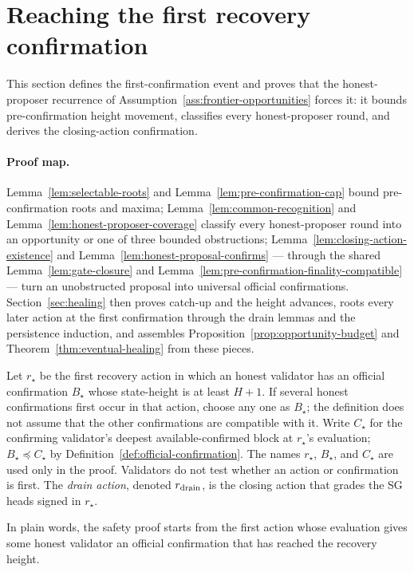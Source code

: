 \section{Reaching the first recovery confirmation}
\label{sec:first-confirmation}

This section defines the first-confirmation event and proves that the
honest-proposer recurrence of
Assumption~\ref{ass:frontier-opportunities} forces it: it bounds
pre-confirmation height movement, classifies every honest-proposer
round, and derives the closing-action confirmation.

\paragraph{Proof map.}
Lemma~\ref{lem:selectable-roots} and
Lemma~\ref{lem:pre-confirmation-cap} bound pre-confirmation roots and
maxima; Lemma~\ref{lem:common-recognition} and
Lemma~\ref{lem:honest-proposer-coverage} classify every
honest-proposer round into an opportunity or one of three bounded
obstructions; Lemma~\ref{lem:closing-action-existence} and
Lemma~\ref{lem:honest-proposal-confirms} --- through the shared
Lemma~\ref{lem:gate-closure} and
Lemma~\ref{lem:pre-confirmation-finality-compatible} --- turn an
unobstructed proposal into universal official confirmations.
Section~\ref{sec:healing} then proves catch-up and the height
advances, roots every later action at the first confirmation through
the drain lemmas and the persistence induction, and assembles
Proposition~\ref{prop:opportunity-budget} and
Theorem~\ref{thm:eventual-healing} from these pieces.

\begin{definition}
\label{def:first-recovery-confirmation}
Let \(r_\star\) be the first recovery action in which an honest validator has
an official confirmation \(B_\star\) whose state-height is at least \(H+1\).
If several honest confirmations first occur in that action, choose any one
as \(B_\star\); the definition does not assume that the other confirmations
are compatible with it.  Write \(C_\star\) for the confirming validator's
deepest available-confirmed block at \(r_\star\)'s evaluation;
\(B_\star\preceq C_\star\) by Definition~\ref{def:official-confirmation}.
The names \(r_\star\), \(B_\star\), and \(C_\star\) are used only
in the proof.  Validators do not test whether an action or confirmation is
first.  The \emph{drain action}, denoted \(r_{\rm drain}\), is the closing
action that grades the SG heads signed in \(r_\star\).

In plain words, the safety proof starts from the first action whose evaluation
gives some honest validator an official confirmation that has reached the
recovery height.
\end{definition}

